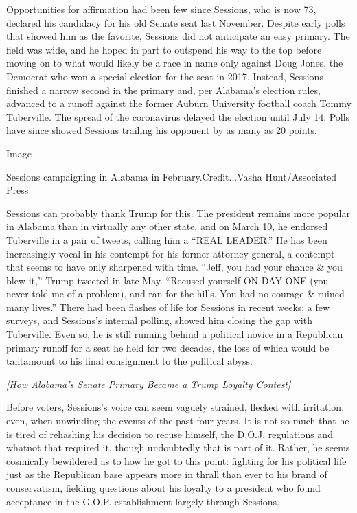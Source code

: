 Opportunities for affirmation had been few since Sessions, who is now
73, declared his candidacy for his old Senate seat last November.
Despite early polls that showed him as the favorite, Sessions did not
anticipate an easy primary. The field was wide, and he hoped in part to
outspend his way to the top before moving on to what would likely be a
race in name only against Doug Jones, the Democrat who won a special
election for the seat in 2017. Instead, Sessions finished a narrow
second in the primary and, per Alabama's election rules, advanced to a
runoff against the former Auburn University football coach Tommy
Tuberville. The spread of the coronavirus delayed the election until
July 14. Polls have since showed Sessions trailing his opponent by as
many as 20 points.

Image

Sessions campaigning in Alabama in February.Credit...Vasha
Hunt/Associated Press

Sessions can probably thank Trump for this. The president remains more
popular in Alabama than in virtually any other state, and on March 10,
he endorsed Tuberville in a pair of tweets, calling him a ``REAL
LEADER.'' He has been increasingly vocal in his contempt for his former
attorney general, a contempt that seems to have only sharpened with
time. ``Jeff, you had your chance \& you blew it,'' Trump tweeted in
late May. ``Recused yourself ON DAY ONE (you never told me of a
problem), and ran for the hills. You had no courage \& ruined many
lives.'' There had been flashes of life for Sessions in recent weeks; a
few surveys, and Sessions's internal polling, showed him closing the gap
with Tuberville. Even so, he is still running behind a political novice
in a Republican primary runoff for a seat he held for two decades, the
loss of which would be tantamount to his final consignment to the
political abyss.

\emph{\href{https://www.nytimes3xbfgragh.onion/2020/02/10/magazine/alabama-republican-primary-senate.html}{{[}How
Alabama's Senate Primary Became a Trump Loyalty Contest{]}}}

Before voters, Sessions's voice can seem vaguely strained, flecked with
irritation, even, when unwinding the events of the past four years. It
is not so much that he is tired of rehashing his decision to recuse
himself, the D.O.J. regulations and whatnot that required it, though
undoubtedly that is part of it. Rather, he seems cosmically bewildered
as to how he got to this point: fighting for his political life just as
the Republican base appears more in thrall than ever to his brand of
conservatism, fielding questions about his loyalty to a president who
found acceptance in the G.O.P. establishment largely through Sessions.

